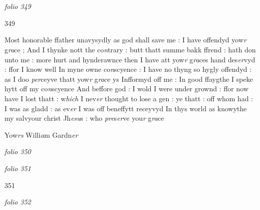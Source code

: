 \documentclass[12pt, a4paper]{book}
\begin{document}
\dotfill
						\newpage {} \section*{}

\textit{folio 349}



\begin{flushright}{\color{Mahogany}349}\end{flushright}

		\ifthenelse{\isodd{\thepage}}
		{\reversemarginpar}
		{\normalmarginpar}
		Most honorable ffather unavysydly as god shall save 
me : I have offendyd yow\textit{r} g\textit{ra}ce ; And I thynke nott
the co\textit{n}trary : butt thatt summe bakk ffrend : hath
don unto me : more hurt and hynderawnce
then I have att yow\textit{r} g\textit{ra}ces hand des\textit{er}vyd : ffor I
know well In myne owne co\textit{n}scyence : I have 
no thyng so hygly offendyd : as I doo \textit{per}ceyve
thatt yow\textit{r} g\textit{ra}ce ys Infformyd off me : In good 
ffaygthe I speke hytt off my co\textit{n}scyence And beffore
god : I wold I were under grownd : ffor now
have I lost thatt : w\textit{hich} I nev\textit{er} thought to lose
a gen : ye thatt : off whom had : I was as 
gladd : as ev\textit{er} I was off beneffytt receyvyd
In thys world as knowythe my salvyour christ
Jh\textit{esu}s : who \textit{pre}s\textit{er}ve you\textit{r} g\textit{ra}ce


		\ifthenelse{\isodd{\thepage}}
		{\reversemarginpar}
		{\normalmarginpar}
		Yow\textit{rs} Willi\textit{a}m 
Gardn\textit{er}
               
\dotfill
						\newpage
{}

\textit{folio 350}


         \vspace*{4cm}
         
\dotfill
						

\textit{folio 351}


\begin{flushright}{\color{Mahogany}351}\end{flushright}

\dotfill
						\newpage
{}

\textit{folio 352}


         \vspace*{4cm}
         
\end{document}
